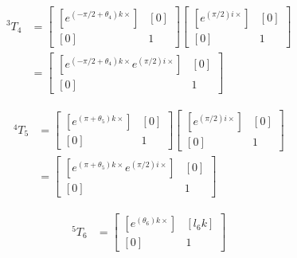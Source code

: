 \begin{solutionbox}[Q2-1]
    \begin{align*}
        {\,^3T_4} & =
        \begin{bmatrix}
            [e^{\left(-\pi/2+\theta_4\right)k\times}] & [0] \\
            [0]                                       & 1
        \end{bmatrix}
        \begin{bmatrix}
            [e^{\left(\pi/2\right)i\times}] & [0] \\
            [0]                             & 1
        \end{bmatrix} \\
                  & =
        \begin{bmatrix}
            [e^{\left(-\pi/2+\theta_4\right)k\times} e^{\left(\pi/2\right)i\times}] & [0] \\
            [0]                                                                     & 1
        \end{bmatrix}
    \end{align*}

    \begin{align*}
        {\,^4T_5} & =
        \begin{bmatrix}
            [e^{\left(\pi+\theta_5\right)k\times}] & [0] \\
            [0]                                    & 1
        \end{bmatrix}
        \begin{bmatrix}
            [e^{\left(\pi/2\right)i\times}] & [0] \\
            [0]                             & 1
        \end{bmatrix} \\
                  & =
        \begin{bmatrix}
            [e^{\left(\pi+\theta_5\right)k\times} e^{\left(\pi/2\right)i\times}] & [0] \\
            [0]                                                                  & 1
        \end{bmatrix}
    \end{align*}

    \begin{align*}
        {\,^5T_6} & =
        \begin{bmatrix}
            [e^{\left(\theta_6\right)k\times}] & [l_6k] \\
            [0]                                & 1
        \end{bmatrix}
    \end{align*}
\end{solutionbox}

